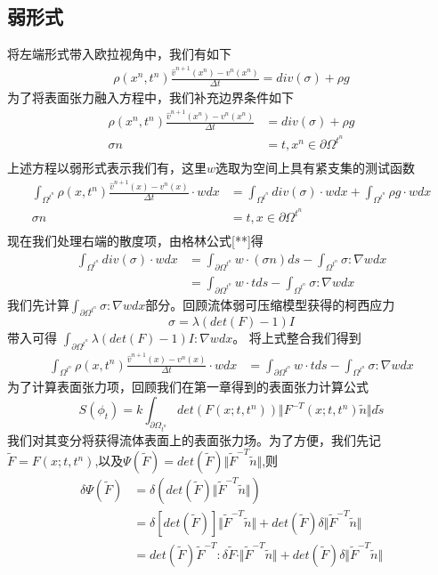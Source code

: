 \subsection{弱形式}
将左端形式带入欧拉视角中，我们有如下
\begin{align*}
    \rho(x^n,t^n)\frac{\hat{v}^{n+1}(x^n) - v^n(x^n)}{\Delta t} = div(\sigma) + \rho g
\end{align*}
为了将表面张力融入方程中，我们补充边界条件如下
\begin{align*}
    \rho(x^n,t^n)\frac{\hat{v}^{n+1}(x^n) - v^n(x^n)}{\Delta t} &= div(\sigma) + \rho g \\
    \sigma n &= t, x^n \in \partial \Omega^{t^n}\\
\end{align*}
上述方程以弱形式表示我们有，这里$w$选取为空间上具有紧支集的测试函数
\begin{align*}
    \int_{\Omega^{t^n}}\rho(x,t^n)\frac{\hat{v}^{n+1}(x) - v^n(x)}{\Delta t}\cdot wdx &= \int_{\Omega^{t^n}} div(\sigma)\cdot w dx + \int_{\Omega^{t^n}}\rho g\cdot w dx\\
    \sigma n &= t, x \in \partial \Omega^{t^n}\\   
\end{align*}
现在我们处理右端的散度项，由格林公式[**]得
\begin{align*}
    \int_{\Omega^{t^n}} div(\sigma)\cdot w dx &= \int_{\partial \Omega^{t^n}}w\cdot (\sigma n) ds - \int_{\Omega^{t^n}} \sigma : \nabla w dx\\
        &= \int_{\partial \Omega^{t^n}}w\cdot t ds - \int_{\Omega^{t^n}} \sigma :\nabla w dx
\end{align*}
我们先计算$\int_{\partial \Omega^{t^n}}\sigma : \nabla w dx$部分。回顾流体弱可压缩模型获得的柯西应力$$\sigma = \lambda (det(F) - 1)I$$带入可得
$\int_{\partial \Omega^{t^n}} \lambda (det(F) - 1) I:\nabla w dx$。
将上式整合我们得到
\begin{align*}
    \int_{\Omega^{t^n}}\rho(x,t^n)\frac{\hat{v}^{n+1}(x) - v^n(x)}{\Delta t}\cdot wdx &= \int_{\partial \Omega^{t^n}} w\cdot t ds - \int_{\Omega^{t^n}} \sigma:\nabla w dx
\end{align*}
为了计算表面张力项，回顾我们在第一章得到的表面张力计算公式
$$S(\phi_{t}) = k \int_{\partial \Omega_{t^n}} det(F(x;t,t^{n})) \Vert F^{-T}(x;t,t^{n})\tilde{n}\Vert d\tilde{s}$$
我们对其变分将获得流体表面上的表面张力场。为了方便，我们先记$\tilde{F} = F(x;t,t^n)$,以及$\Psi(\tilde{F}) = det(\tilde{F})\Vert \tilde{F}^{-T}\tilde{n} \Vert$,则
\begin{align}
    \delta \Psi(\tilde{F}) &= \delta(det(\tilde{F})\Vert \tilde{F}^{-T}\tilde{n} \Vert) \nonumber\\
    &= \delta[det(\tilde{F})] \Vert \tilde{F}^{-T} \tilde{n} \Vert + det(\tilde{F})\delta \Vert \tilde{F}^{-T}\tilde{n} \Vert \nonumber\\
    &= det(\tilde{F})\tilde{F}^{-T}:\delta \tilde{F} \cdot \Vert \tilde{F}^{-T}\tilde{n}\Vert + det(\tilde{F})\delta \Vert \tilde{F}^{-T} \tilde{n} \Vert
\end{align}
